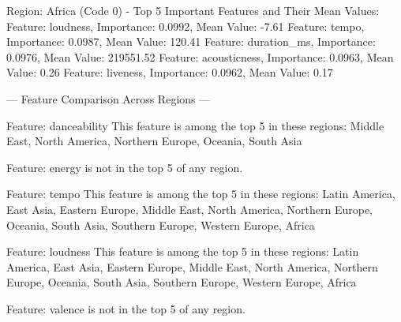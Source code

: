 Region: Africa (Code 0) - Top 5 Important Features and Their Mean Values:
Feature: loudness, Importance: 0.0992, Mean Value: -7.61
Feature: tempo, Importance: 0.0987, Mean Value: 120.41
Feature: duration\_ms, Importance: 0.0976, Mean Value: 219551.52
Feature: acousticness, Importance: 0.0963, Mean Value: 0.26
Feature: liveness, Importance: 0.0962, Mean Value: 0.17

--- Feature Comparison Across Regions ---

Feature: danceability
This feature is among the top 5 in these regions: Middle East, North America, Northern Europe, Oceania, South Asia

Feature: energy is not in the top 5 of any region.

Feature: tempo
This feature is among the top 5 in these regions: Latin America, East Asia, Eastern Europe, Middle East, North America, Northern Europe, Oceania, South Asia, Southern Europe, Western Europe, Africa

Feature: loudness
This feature is among the top 5 in these regions: Latin America, East Asia, Eastern Europe, Middle East, North America, Northern Europe, Oceania, South Asia, Southern Europe, Western Europe, Africa

Feature: valence is not in the top 5 of any region.
